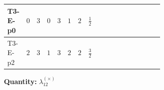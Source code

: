 \documentclass[8pt]{article}
\begin{document}
\begin{landscape}
\begin{longtable}{@{}llcccccc >{\raggedright\arraybackslash}p{0.21\linewidth} >{\raggedright\arraybackslash}p{0.21\linewidth} >{\raggedright\arraybackslash}p{0.21\linewidth}@{}}
T3-E-p0 & $0$ & $3$ & $0$ & $3$ & $1$ & $2$ & $\frac{1}{2}$ & \scriptsize\adjustbox{max width=\linewidth}{$\begin{gathered} {\lambda_{12}^{(1)}} \left(\frac{1}{2} T_{\nu}^{(1)}+\frac{1}{2} T_{\nu}^{(2)}+8 {\lambda_{12}^{(\times)}}+{\lambda_{S_1}^{(A)}}+{\lambda_{S_2}^{(A)}}\right)\end{gathered}$} & \scriptsize\adjustbox{max width=\linewidth}{$\begin{gathered} +{\lambda_{12}^{(\times)}} (2 T_{\nu}^{(1)}+2 T_{\nu}^{(2)})\end{gathered}$} & \scriptsize\adjustbox{max width=\linewidth}{$\begin{gathered} -\frac{7}{6} \operatorname{Tr}\!\left({y_1}\,\left({y_1}\right)^{\dagger}\,{y_2}\,\left({y_2}\right)^{\dagger}\right)\end{gathered}$} \\
\midrule
T3-E-p2 & $2$ & $3$ & $1$ & $3$ & $2$ & $2$ & $\frac{3}{2}$ & \scriptsize\adjustbox{max width=\linewidth}{$\begin{gathered} {\lambda_{12}^{(1)}} \left(\frac{1}{2} T_{\nu}^{(1)}+\frac{1}{2} T_{\nu}^{(2)}+8 {\lambda_{12}^{(\times)}}+{\lambda_{S_1}^{(A)}}+{\lambda_{S_2}^{(A)}}\right)\end{gathered}$} & \scriptsize\adjustbox{max width=\linewidth}{$\begin{gathered} +{\lambda_{12}^{(\times)}} (2 T_{\nu}^{(1)}+2 T_{\nu}^{(2)})\end{gathered}$} & \scriptsize\adjustbox{max width=\linewidth}{$\begin{gathered} -\frac{7}{6} \operatorname{Tr}\!\left({y_1}\,\left({y_1}\right)^{\dagger}\,{y_2}\,\left({y_2}\right)^{\dagger}\right)\end{gathered}$} \\
\midrule
\bottomrule
\end{longtable}
\clearpage
\noindent\textbf{Quantity: }$\lambda_{12}^{(\times)}$\par\smallskip

\end{landscape}
\end{document}
